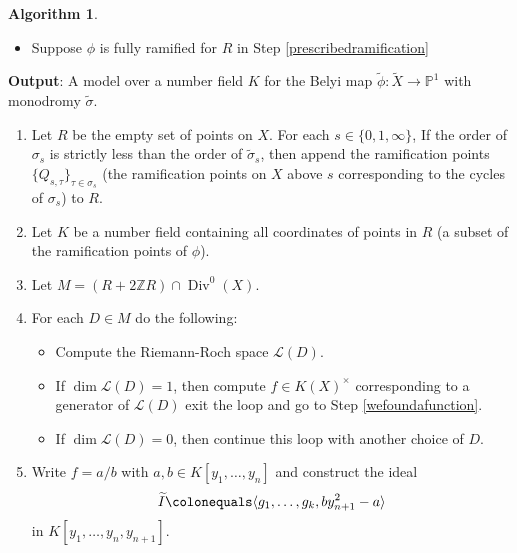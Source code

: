 \documentclass{dcthesis}
\newcommand{\PP}{\mathbb P}
\newcommand{\ZZ}{\mathbb Z}
\newcommand{\mm}[1]{{\color{blue} \sf MM: [#1]}}
\newcommand{\wt}[1]{\widetilde{#1}}
\newcommand{\LL}{\mathscr L}
\DeclareMathOperator{\Div}{Div}
\theoremstyle{definition}
\newtheorem{alg}[prop]{Algorithm}
\theoremstyle{remark}
\numberwithin{equation}{section}
\numberwithin{figure}{section}
\begin{document}
{{\begin{alg}
\begin{itemize}
        \item
          Suppose $\phi$ is fully ramified for
          $R$ in Step \ref{prescribedramification}
      \end{itemize}
      \textbf{Output}: A model over a number field $K$ for the Belyi map
      $\wt{\phi}:\wt{X}\to\PP^1$
      with monodromy $\wt{\sigma}$.
      \begin{enumerate}
        \item
          \label{prescribedramification}
          Let $R$ be the empty set of points on $X$.
          For each $s\in\{0,1,\infty\}$,
          If the order of $\sigma_s$ is strictly less than the order of $\wt{\sigma}_s$,
          then append the ramification points
          $\{Q_{s,\tau}\}_{\tau\in\sigma_s}$
          (the ramification points on $X$ above $s$ corresponding to the cycles of $\sigma_s$)
          to $R$.
        \item
          Let $K$ be a number field containing all coordinates of
          points in $R$
          (a subset of the ramification points of $\phi$).
        \item
          Let $M = (R+2\ZZ R)\cap\Div^0(X)$.
        \item
          \label{ramificationfulloop}
          For each $D\in M$ do the following:
          \begin{itemize}
            \item
              Compute the Riemann-Roch space $\LL(D)$.
            \item
              If $\dim\LL(D) = 1$, then
              compute $f\in K(X)^\times$
              corresponding to a generator
              of $\LL(D)$
              exit the loop
              and go to Step \ref{wefoundafunction}.
            \item
              If $\dim\LL(D) = 0$,
              then continue this loop
              with another choice of $D$.
          \end{itemize}
        \item
          \label{wefoundafunction}
          Write $f=a/b$ with $a,b\in K[y_1,\dots,y_n]$ and construct the ideal
          \[
            \wt{I}\colonequals\langle g_1,\dots,g_k, by_{n+1}^2-a\rangle
          \]
          in $K[y_1,\dots,y_n,y_{n+1}]$.

\end{enumerate}
\end{alg}}}
\end{document}

